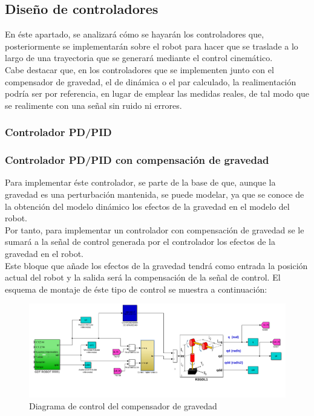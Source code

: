 	\subsection{Diseño de controladores}
	En éste apartado, se analizará cómo se hayarán los controladores que, posteriormente se implementarán sobre el robot para hacer que se traslade a lo largo de una trayectoria que se generará mediante el control cinemático.\\
	Cabe destacar que, en los controladores que se implementen junto con el compensador de gravedad, el de dinámica o el par calculado, la realimentación podría ser por referencia, en lugar de emplear las medidas reales, de tal modo que se realimente con una señal sin ruido ni errores.

	\subsubsection{Controlador PD/PID}
	\subsubsection{Controlador PD/PID con compensación de gravedad}
	Para implementar éste controlador, se parte de la base de que, aunque la gravedad es una perturbación mantenida, se puede
modelar, ya que se conoce de la obtención del modelo dinámico los efectos de la gravedad en el modelo del robot.\\
Por tanto, para implementar un controlador con compensación de gravedad se le sumará a la señal de control generada por el
controlador los efectos de la gravedad en el robot.\\
Este bloque que añade los efectos de la gravedad tendrá como entrada la posición actual del robot y la salida será la compensación de la señal de control. El esquema de montaje de éste tipo de control se muestra a continuación:

\begin{figure}[h!]
	\centering
	\includegraphics[width=.8\textwidth]{montaje_grav}
	\caption{Diagrama de control del compensador de gravedad}
\end{figure}

